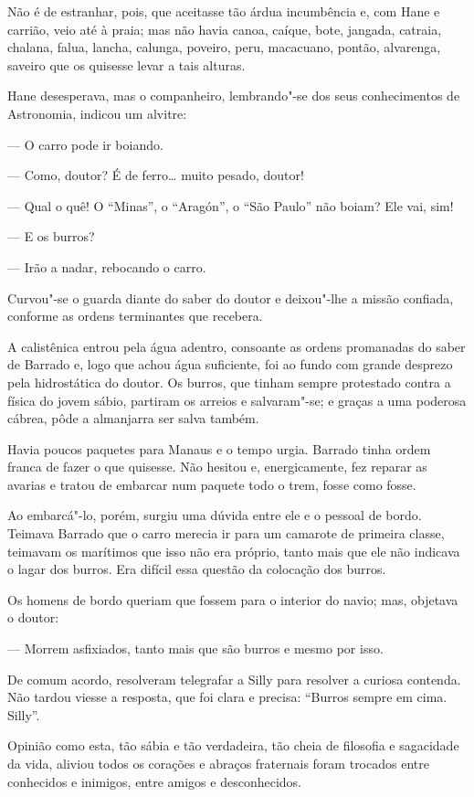 Não é de estranhar, pois, que aceitasse tão árdua incumbência e, com
Hane e carrião, veio até à praia; mas não havia canoa, caíque, bote,
jangada, catraia, chalana, falua, lancha, calunga, poveiro, peru,
macacuano, pontão, alvarenga, saveiro que os quisesse levar a tais
alturas.

Hane desesperava, mas o companheiro, lembrando"-se dos seus conhecimentos
de Astronomia, indicou um alvitre:

--- O carro pode ir boiando.

--- Como, doutor? É de ferro\ldots{} muito pesado, doutor!

--- Qual o quê! O ``Minas'', o ``Aragón'', o ``São Paulo'' não boiam?
Ele vai, sim!

--- E os burros?

--- Irão a nadar, rebocando o carro.

Curvou"-se o guarda diante do saber do doutor e deixou"-lhe a missão
confiada, conforme as ordens terminantes que recebera.

A calistênica entrou pela água adentro, consoante as ordens promanadas
do saber de Barrado e, logo que achou água suficiente, foi ao fundo com
grande desprezo pela hidrostática do doutor. Os burros, que tinham
sempre protestado contra a física do jovem sábio, partiram os arreios e
salvaram"-se; e graças a uma poderosa cábrea, pôde a almanjarra ser salva
também.

Havia poucos paquetes para Manaus e o tempo urgia. Barrado tinha ordem
franca de fazer o que quisesse. Não hesitou e, energicamente, fez
reparar as avarias e tratou de embarcar num paquete todo o trem, fosse
como fosse.

Ao embarcá"-lo, porém, surgiu uma dúvida entre ele e o pessoal de bordo.
Teimava Barrado que o carro merecia ir para um camarote de primeira
classe, teimavam os marítimos que isso não era próprio, tanto mais que
ele não indicava o lagar dos burros. Era difícil essa questão da
colocação dos burros.

Os homens de bordo queriam que fossem para o interior do navio; mas,
objetava o doutor:

--- Morrem asfixiados, tanto mais que são burros e mesmo por isso.

De comum acordo, resolveram telegrafar a Silly para resolver a curiosa
contenda. Não tardou viesse a resposta, que foi clara e precisa:
``Burros sempre em cima. Silly''.

Opinião como esta, tão sábia e tão verdadeira, tão cheia de filosofia e
sagacidade da vida, aliviou todos os corações e abraços fraternais foram
trocados entre conhecidos e inimigos, entre amigos e desconhecidos.

